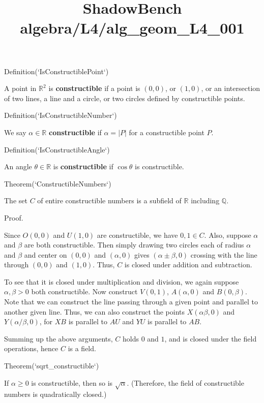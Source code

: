 \documentclass{article}
\title{ShadowBench algebra/L4/alg\_geom\_L4\_001}
\begin{document}
\maketitle

Definition(`IsConstructiblePoint`)

A point in $\mathbb{R}^2$ is \textbf{constructible} if a point is $(0, 0)$, or $(1, 0)$, or an intersection of two lines, a line and a circle, or two circles defined by constructible points.

Definition(`IsConstructibleNumber`)

We say $\alpha \in \mathbb{R}$ \textbf{constructible} if $\alpha = |P|$ for a constructible point $P$.

Definition(`IsConstructibleAngle`)

An angle $\theta \in \mathbb{R}$ is \textbf{constructible} if $\cos \theta$ is constructible.

Theorem(`ConstructibleNumbers`)

The set $C$ of entire constructible numbers is a subfield of $\mathbb{R}$ including $\mathbb{Q}$.

Proof.

Since $O(0, 0)$ and $U(1, 0)$ are constructible, we have $0, 1 \in C$. Also, suppose $\alpha$ and $\beta$ are both constructible. Then simply drawing two circles each of radius $\alpha$ and $\beta$ and center on $(0, 0)$ and $(\alpha, 0)$ gives $(\alpha\pm\beta, 0)$ crossing with the line through $(0, 0)$ and $(1, 0)$. Thus, $C$ is closed under addition and subtraction.

To see that it is closed under multiplication and division, we again suppose $\alpha, \beta > 0$ both constructible. Now construct $V(0, 1)$, $A(\alpha, 0)$ and $B(0, \beta)$. Note that we can construct the line passing through a given point and parallel to another given line. Thus, we can also construct the points $X(\alpha\beta, 0)$ and $Y(\alpha/\beta,0)$, for $XB$ is parallel to $AU$ and $YU$ is parallel to $AB$.

Summing up the above arguments, $C$ holds $0$ and $1$, and is closed under the field operations, hence $C$ is a field.

Theorem(`sqrt_constructible`)

If $\alpha \ge 0$ is constructible, then so is $\sqrt{\alpha}$. (Therefore, the field of constructible numbers is quadratically closed.)
\end{document}
